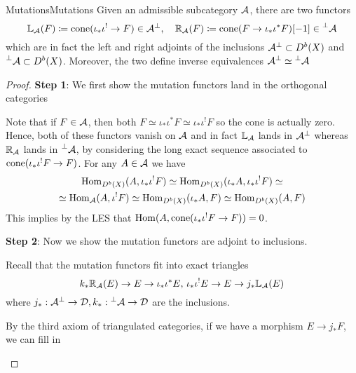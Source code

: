 \begin{definition}{Mutations}{Mutations}
    Given an admissible subcategory $\mathcal{A}$, there are two functors
    \begin{equation*}
        \mathbb{L}_{\mathcal{A}}(F) \coloneqq \operatorname{cone}(\iota_*\iota^!\to F)\in \mathcal{A}^\perp, \quad
        \mathbb{R}_{\mathcal{A}}(F) \coloneqq \operatorname{cone}(F\to \iota_*\iota^* F )[-1]\in \prescript{\perp}{}{\mathcal{A}}
    \end{equation*}
    which are in fact the left and right adjoints of the inclusions $\mathcal{A}^\perp \subset D^b(X)$ and $\prescript{\perp}{}{\mathcal{A}}\subset D^b(X)$. Moreover, the two define inverse equivalences $\mathcal{A}^\perp \simeq \prescript{\perp}{}{}\mathcal{A}$
\end{definition}

\begin{proof}
    \textbf{Step 1}: We first show the mutation functors land in the orthogonal categories

    Note that if $F\in \mathcal{A}$, then both $F\simeq \iota_*\iota^* F \simeq \iota_*\iota^! F$ so the cone is actually zero. Hence, both of these functors vanish on $\mathcal{A}$ and in fact $\mathbb{L}_{\mathcal{A}}$ lands in $\mathcal{A}^\perp$ whereas $\mathbb{R}_{\mathcal{A}}$ lands in $\prescript{\perp}{}{\mathcal{A}}$, by considering the long exact sequence associated to $\operatorname{cone}(\iota_*\iota^!F\to F)$. For any $A\in \mathcal{A}$ we have
    \begin{gather*}
        \operatorname{Hom}_{D^b(X)}(A, \iota_*\iota^!F)
            \simeq \operatorname{Hom}_{D^b(X)}(\iota_* A, \iota_*\iota^!F)\simeq \\
            \simeq \operatorname{Hom}_{\mathcal{A}}(A, \iota^!F)\simeq \operatorname{Hom}_{D^b(X)}(\iota_* A, F)
            \simeq \operatorname{Hom}_{D^b(X)}(A, F)
    \end{gather*}
    This implies by the LES that $\operatorname{Hom}(A,\operatorname{cone}(\iota_*\iota^!F\to F))=0$.

    \textbf{Step 2}: Now we show the mutation functors are adjoint to inclusions.

    Recall that the mutation functors fit into exact triangles $$k_*\mathbb{R}_{\mathcal{A}} (E)\rightarrow E \rightarrow \iota_* \iota^* E,\, \iota_* \iota^! E \rightarrow E \rightarrow j_*\mathbb{L}_{\mathcal{A}}(E)$$
    where $j_*: \mathcal{A}^\perp \rightarrow \mathcal{D}, k_*: \prescript{\perp}{}{}\mathcal{A}\rightarrow \mathcal{D}$ are the inclusions.

    By the third axiom of triangulated categories, if we have a morphism $E\rightarrow j_*F$, we can fill in
    \begin{center}
    \end{center}


\end{proof}
